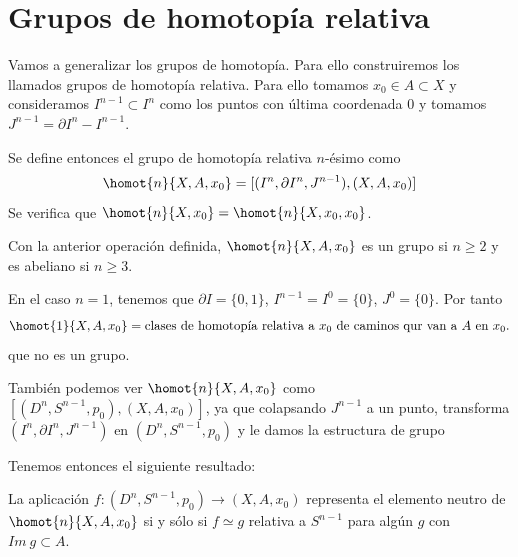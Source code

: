 \section{Grupos de homotopía relativa}
Vamos a generalizar los grupos de homotopía. Para ello construiremos los llamados grupos de homotopía relativa. Para ello tomamos $x_0 \in A \subset X$ y consideramos $I^{n-1} \subset I^n$ como los puntos con última coordenada $0$ 
y tomamos $J^{n-1} = \partial I^n - I^{n-1}$. \par
Se define entonces el grupo de homotopía relativa $n$-ésimo como
\[
\homot{n}{X, A, x_0} = [(I^n, \partial I^n, J^{n-1}), (X, A, x_0)]
\]
Se verifica que $\homot{n}{X, x_0} = \homot{n}{X, x_0, x_0}$. \par
Con la anterior operación definida, $\homot{n}{X, A, x_0}$ es un grupo si $n \geq 2$ y es abeliano si $n \geq 3$. \par
En el caso $n = 1$, tenemos que $\partial I = \{0,1\}$, $I^{n-1} = I^0 = \{0\}$, $J^0 = \{0\}$. Por tanto
\[
\homot{1}{X, A, x_0} = \text{clases de homotopía relativa a } x_0 \text{ de caminos qur van a } A \text{ en } x_0.
\]
que no es un grupo. \par
También podemos ver $\homot{n}{X, A, x_0}$ como $[(D^n, S^{n-1}, p_0), (X, A, x_0)]$, ya que colapsando $J^{n-1}$ a un punto, transforma $(I^n, \partial I^n, J^{n-1})$ en $(D^n, S^{n-1}, p_0)$ y le damos la estructura de grupo  \par
Tenemos entonces el siguiente resultado:
\begin{teor}
La aplicación $ f : (D^n, S^{n-1}, p_0) \longrightarrow (X, A, x_0)$ representa el elemento neutro de $\homot{n}{X, A, x_0}$ si y sólo si $f \simeq g$ relativa a $S^{n-1}$ para algún $g$ con $Im\ g \subset A$.
\end{teor}
